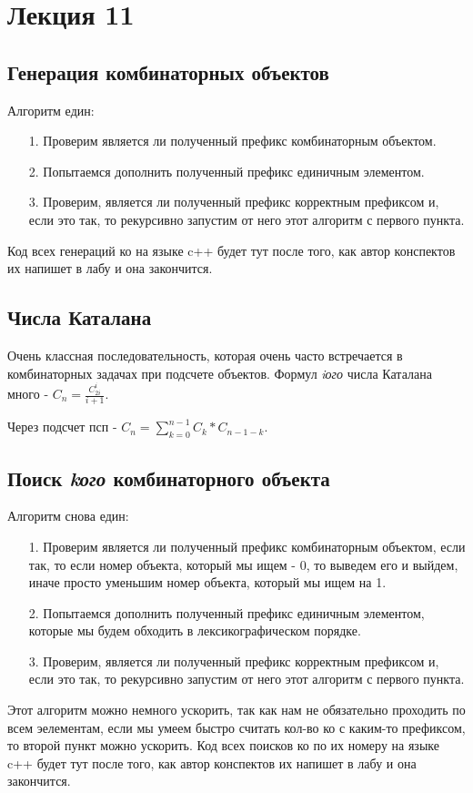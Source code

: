 \documentclass{article}
\begin{document}
\section{Лекция 11}
\subsection{Генерация комбинаторных объектов}
Алгоритм един:
\begin{enumerate}
    \item[1.] Проверим является ли полученный префикс комбинаторным объектом.
    \item[2.] Попытаемся дополнить полученный префикс единичным элементом.
    \item[3.] Проверим, является ли полученный префикс корректным префиксом и, если это так, то рекурсивно запустим от него этот алгоритм с первого пункта. 
\end{enumerate}
Код всех генераций ко на языке c++ будет тут после того, как автор конспектов их напишет в лабу и она закончится.
\subsection{Числа Каталана}
Очень классная последовательность, которая очень часто встречается в комбинаторных задачах при подсчете объектов. Формул \textit{iого} числа Каталана много - $\displaystyle C_n = \frac{C^i_{2i}}{i+1}$.

Через подсчет псп - $\displaystyle C_n = \sum\limits_{k=0}^{n-1}C_k*C_{n-1-k}$.

\subsection{Поиск \textit{kого} комбинаторного объекта}
Алгоритм снова един:
\begin{enumerate}
    \item[1.] Проверим является ли полученный префикс комбинаторным объектом, если так, то если номер объекта, который мы ищем - 0, то выведем его и выйдем, иначе просто уменьшим номер объекта, который мы ищем на 1.
    \item[2.] Попытаемся дополнить полученный префикс единичным элементом, которые мы будем обходить в лексикографическом порядке.
    \item[3.] Проверим, является ли полученный префикс корректным префиксом и, если это так, то рекурсивно запустим от него этот алгоритм с первого пункта. 
\end{enumerate}
Этот алгоритм можно немного ускорить, так как нам не обязательно проходить по всем эелементам, если мы умеем быстро считать кол-во ко с каким-то префиксом, то второй пункт можно ускорить.
Код всех поисков ко по их номеру на языке c++ будет тут после того, как автор конспектов их напишет в лабу и она закончится.
\end{document}
